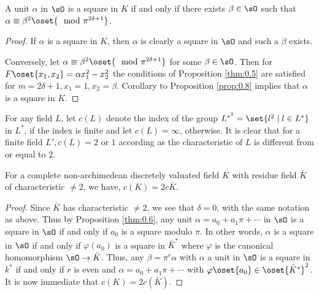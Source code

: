 \begin{prop}\label{prop:0.9}
A unit $\alpha$ in $\sO$ is a square in $K$ if and only if there 
exists $\beta\in\sO$ such that $\alpha\equiv\beta^2 \oset{\mod 
\pi^{2\delta +1}}$. 
\end{prop}
\begin{proof}
If $\alpha$ is a square in $K$, then $\alpha$ is clearly a square in 
$\sO$ and such a $\beta$ exists.

Conversely, let $\alpha\equiv\beta^2 \oset{\mod\pi^{2\delta+1}}$ for 
some $\beta\in\sO$. Then for $F\oset{x_1,x_2}=\alpha x_1^2-x_2^2$ the 
conditions of Proposition \ref{thm:0.5} are satisfied for 
$m=2\delta+1,x_1=1, x_2=\beta$. Corollary to Proposition 
\ref{prop:0.8} implies that $\alpha$ is a square in $K$. 
\end{proof}

For any field $L$, let $c(L)$ denote the index of the group 
$L^{*^2}=\set{l^2\mid l\in L ^*}$ in $L^*$, if the index is finite and 
let $c(L)=\infty$, otherwise. It is clear that for a finite field 
$L',c(L)=2$ or $1$ according as the characteristic of $L$ is different 
from or equal to $2$. 

\begin{prop}\label{prop:0.10}
For a complete non-archimedean discretely valuated field $K$ with 
residue field $\bar{K}$ of characteristic $\neq 2$, we have, 
$c(K)=2c\bar{K}$.
\end{prop} 

\begin{proof}
Since $\bar{K}$ has characteristic $\neq 2$, we see that $\delta =0$, 
with the same notation as above. Thus by Proposition \ref{thm:0.6}, 
any unit $\alpha =a_0+a_1\pi +\cdots$ in $\sO$ is a square in $\sO$ if 
and only if $a_0$ is a square modulo $\pi$. In other words, $\alpha$ 
is a square in $\sO$ if and only if $\varphi(a_0)$ is a square in 
$\bar{K}^*$ where $\varphi$ is the canonical homomorphism 
$\sO\to\bar{K}$. Thus, any $\beta =\pi^r\alpha$ with $\alpha$ a unit 
in $\sO$ is a square in $k^*$ if and only if $r$ is even and $\alpha 
=a_0+a_1\pi +\cdots$ with $\varphi\oset{a_0}\in 
\oset{\bar{K}^*}^2$. It is now immediate that $c(K)=2c(\bar{K})$.  
\end{proof}

